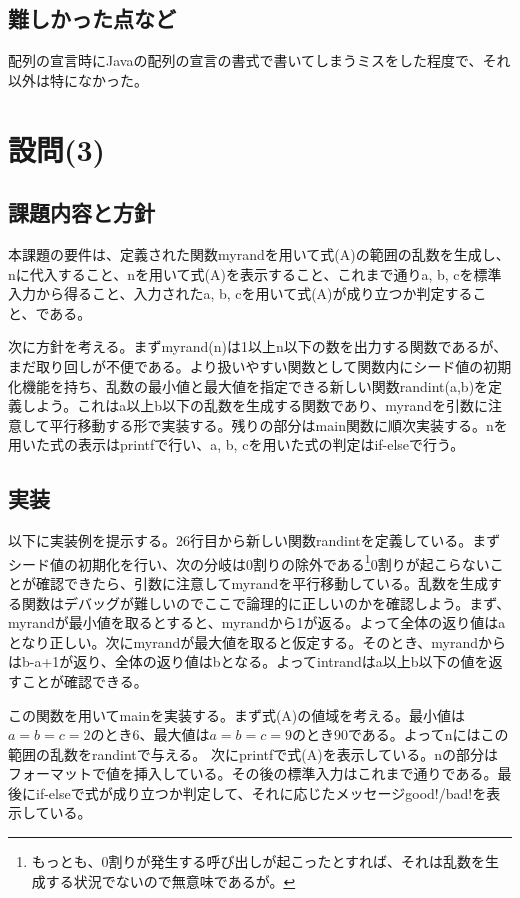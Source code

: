 \documentclass[dvipdfmx,12pt,a4j]{jarticle}
\begin{document}
\subsection{難しかった点など}
配列の宣言時にJavaの配列の宣言の書式で書いてしまうミスをした程度で、それ以外は特になかった。

\section{設問(3)}
\subsection{課題内容と方針}
本課題の要件は、定義された関数myrandを用いて式(A)の範囲の乱数を生成し、nに代入すること、nを用いて式(A)を表示すること、これまで通りa, b, cを標準入力から得ること、入力されたa, b, cを用いて式(A)が成り立つか判定すること、である。

次に方針を考える。まずmyrand(n)は1以上n以下の数を出力する関数であるが、まだ取り回しが不便である。より扱いやすい関数として関数内にシード値の初期化機能を持ち、乱数の最小値と最大値を指定できる新しい関数randint(a,b)を定義しよう。これはa以上b以下の乱数を生成する関数であり、myrandを引数に注意して平行移動する形で実装する。残りの部分はmain関数に順次実装する。nを用いた式の表示はprintfで行い、a, b, cを用いた式の判定はif-elseで行う。

\subsection{実装}
以下に実装例を提示する。26行目から新しい関数randintを定義している。まずシード値の初期化を行い、次の分岐は0割りの除外である\footnote{もっとも、0割りが発生する呼び出しが起こったとすれば、それは乱数を生成する状況でないので無意味であるが。}0割りが起こらないことが確認できたら、引数に注意してmyrandを平行移動している。乱数を生成する関数はデバッグが難しいのでここで論理的に正しいのかを確認しよう。まず、myrandが最小値を取るとすると、myrandから1が返る。よって全体の返り値はaとなり正しい。次にmyrandが最大値を取ると仮定する。そのとき、myrandからはb-a+1が返り、全体の返り値はbとなる。よってintrandはa以上b以下の値を返すことが確認できる。

この関数を用いてmainを実装する。まず式(A)の値域を考える。最小値は$a=b=c=2$のとき6、最大値は$a=b=c=9$のとき90である。よってnにはこの範囲の乱数をrandintで与える。
次にprintfで式(A)を表示している。nの部分はフォーマットで値を挿入している。その後の標準入力はこれまで通りである。最後にif-elseで式が成り立つか判定して、それに応じたメッセージgood!/bad!を表示している。

\end{document}

